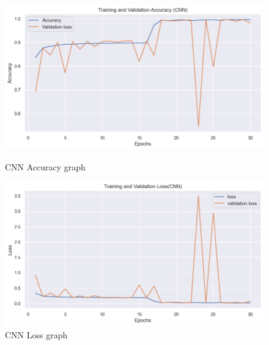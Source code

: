 		
		



		\newpage



		\begin{figure}[t]
			\centering
			\begin{minipage}{0.4\textwidth}
			  \centering
			  \includegraphics[width=1\textwidth]{figures/CNN_training_validation.png}
			  \caption{CNN Accuracy graph}
			  \label{fig:1}
			\end{minipage}
			\hfill
			\begin{minipage}{0.4\textwidth}
			  \centering
			  \includegraphics[width=1\textwidth]{figures/CNN_training_validation_loss.png}
			  \caption{CNN Loss graph}
			  \label{fig:2}
			\end{minipage}
		\end{figure}


		


